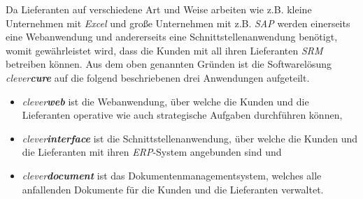 Da Lieferanten auf verschiedene Art und Weise arbeiten wie z.B. kleine Unternehmen mit \emph{Excel} und große Unternehmen mit z.B. \emph{SAP} werden einerseits eine Webanwendung und andererseits eine Schnittstellenanwendung benötigt, womit gewährleistet wird, dass die Kunden mit all ihren Lieferanten \emph{SRM} betreiben können.
\newline
\newline  
Aus dem oben genannten Gründen ist die Softwarelösung \emph{clever\textbf{cure}} auf die folgend beschriebenen drei Anwendungen aufgeteilt.
\begin{itemize}
	\item\emph{clever\textbf{web}} ist die Webanwendung, über welche die Kunden und die Lieferanten operative wie auch strategische Aufgaben durchführen können,
	\item\emph{clever\textbf{interface}} ist die Schnittstellenanwendung, über welche die Kunden und die Lieferanten mit ihren \emph{ERP}-System angebunden sind und
	\item\emph{clever\textbf{document}} ist das Dokumentenmanagementsystem, welches alle anfallenden Dokumente für die Kunden und die Lieferanten verwaltet. 
\end{itemize}

